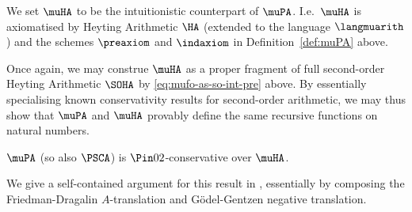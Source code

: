 We set $\muHA$ to be the intuitionistic counterpart of $\muPA$.
I.e.\ $\muHA$ is axiomatised by Heyting Arithmetic $\HA$ (extended to the language $\langmuarith$) and the schemes $\preaxiom$ and $\indaxiom$ in Definition~\ref{def:muPA} above.


Once again, we may construe $\muHA$ as a proper fragment of full second-order Heyting Arithmetic $\SOHA$ by \eqref{eq:mufo-as-so-int-pre} above.
By essentially specialising known conservativity results for second-order arithmetic, we may thus show that $\muPA$ and $\muHA$ provably define the same recursive functions on natural numbers.
\begin{proposition}
\label{thm:muPA-pi02-cons-muHA}
    $\muPA$ (so also $\PSCA$) is $\Pin 0 2$-conservative over $\muHA$.
\end{proposition}


We give a self-contained argument for this result in , essentially by composing the Friedman-Dragalin $A$-translation and G\"odel-Gentzen negative translation. 







